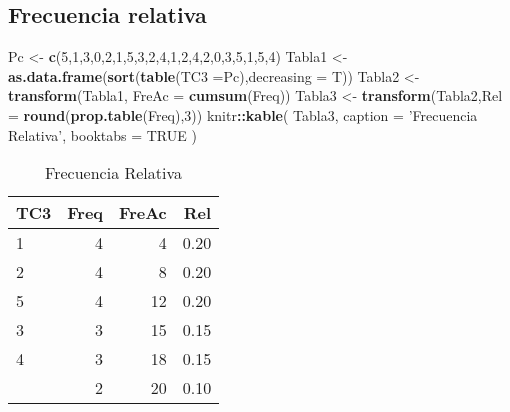 \documentclass[
]{book}
\newenvironment{Shaded}{\begin{snugshade}}{\end{snugshade}}
\newcommand{\DataTypeTok}[1]{\textcolor[rgb]{0.13,0.29,0.53}{#1}}
\newcommand{\DecValTok}[1]{\textcolor[rgb]{0.00,0.00,0.81}{#1}}
\newcommand{\KeywordTok}[1]{\textcolor[rgb]{0.13,0.29,0.53}{\textbf{#1}}}
\newcommand{\NormalTok}[1]{#1}
\newcommand{\OperatorTok}[1]{\textcolor[rgb]{0.81,0.36,0.00}{\textbf{#1}}}
\newcommand{\OtherTok}[1]{\textcolor[rgb]{0.56,0.35,0.01}{#1}}
\newcommand{\StringTok}[1]{\textcolor[rgb]{0.31,0.60,0.02}{#1}}
\theoremstyle{definition}
\theoremstyle{definition}
\theoremstyle{definition}
\theoremstyle{definition}
\theoremstyle{remark}
\begin{document}
\hypertarget{frecuencia-relativa}{%
\subsection{Frecuencia relativa}\label{frecuencia-relativa}}

\begin{Shaded}
\begin{Highlighting}[]
\NormalTok{Pc <-}\StringTok{ }\KeywordTok{c}\NormalTok{(}\DecValTok{5}\NormalTok{,}\DecValTok{1}\NormalTok{,}\DecValTok{3}\NormalTok{,}\DecValTok{0}\NormalTok{,}\DecValTok{2}\NormalTok{,}\DecValTok{1}\NormalTok{,}\DecValTok{5}\NormalTok{,}\DecValTok{3}\NormalTok{,}\DecValTok{2}\NormalTok{,}\DecValTok{4}\NormalTok{,}\DecValTok{1}\NormalTok{,}\DecValTok{2}\NormalTok{,}\DecValTok{4}\NormalTok{,}\DecValTok{2}\NormalTok{,}\DecValTok{0}\NormalTok{,}\DecValTok{3}\NormalTok{,}\DecValTok{5}\NormalTok{,}\DecValTok{1}\NormalTok{,}\DecValTok{5}\NormalTok{,}\DecValTok{4}\NormalTok{)}
\NormalTok{Tabla1 <-}\StringTok{ }\KeywordTok{as.data.frame}\NormalTok{(}\KeywordTok{sort}\NormalTok{(}\KeywordTok{table}\NormalTok{(}\DataTypeTok{TC3 =}\NormalTok{Pc),}\DataTypeTok{decreasing =}\NormalTok{ T))}
\NormalTok{Tabla2 <-}\StringTok{ }\KeywordTok{transform}\NormalTok{(Tabla1, }\DataTypeTok{FreAc =} \KeywordTok{cumsum}\NormalTok{(Freq))}
\NormalTok{Tabla3 <-}\StringTok{ }\KeywordTok{transform}\NormalTok{(Tabla2,}\DataTypeTok{Rel =} \KeywordTok{round}\NormalTok{(}\KeywordTok{prop.table}\NormalTok{(Freq),}\DecValTok{3}\NormalTok{))}
\NormalTok{knitr}\OperatorTok{::}\KeywordTok{kable}\NormalTok{(}
\NormalTok{Tabla3,}
\DataTypeTok{caption =} \StringTok{'Frecuencia Relativa'}\NormalTok{,}
  \DataTypeTok{booktabs =} \OtherTok{TRUE}
\NormalTok{)}
\end{Highlighting}
\end{Shaded}

\begin{table}

\caption{\label{tab:Tabla1}Frecuencia Relativa}
\centering
\begin{tabular}[t]{lrrr}
\toprule
TC3 & Freq & FreAc & Rel\\
\midrule
1 & 4 & 4 & 0.20\\
2 & 4 & 8 & 0.20\\
5 & 4 & 12 & 0.20\\
3 & 3 & 15 & 0.15\\
4 & 3 & 18 & 0.15\\
\addlinespace
0 & 2 & 20 & 0.10\\
\bottomrule
\end{tabular}
\end{table}
\end{document}
